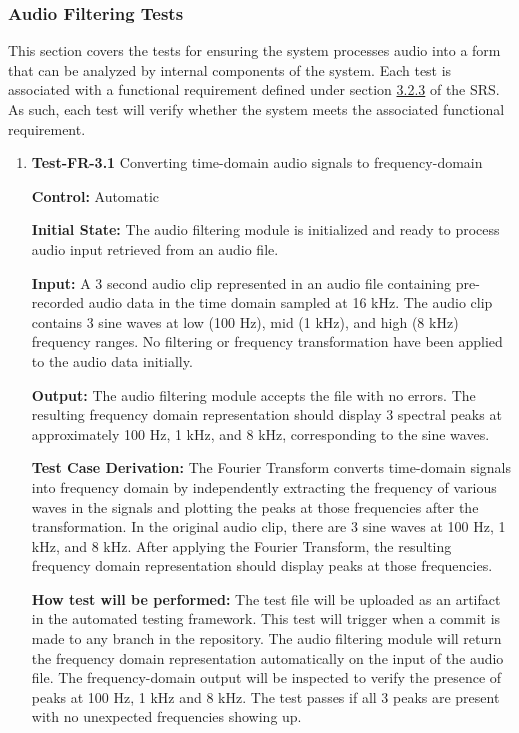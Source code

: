 \documentclass[12pt, titlepage]{article}
\begin{document}
\subsubsection{Audio Filtering Tests}

This section covers the tests for ensuring the system processes audio into a
form that can be analyzed by internal components of the system. Each test is
associated with a functional requirement defined under section
\hyperref[SRS-sec:FR3]{3.2.3} of the SRS. As such, each test will verify whether
the system meets the associated functional requirement. 

\begin{enumerate}

\item{\textbf{Test-FR-3.1} Converting time-domain audio signals to
frequency-domain \\}

\textbf{Control:} Automatic
					
\textbf{Initial State:} 
The audio filtering module is initialized and ready to process audio input
retrieved from an audio file. 
					
\textbf{Input:}
A 3 second audio clip represented in an audio file containing pre-recorded audio
data in the time domain sampled at 16 kHz. The audio clip contains 3 sine waves
at low (100 Hz), mid (1 kHz), and high (8 kHz) frequency ranges. No filtering or
frequency transformation have been applied to the audio data initially.
					
\textbf{Output:}
The audio filtering module accepts the file with no errors. The resulting
frequency domain representation should display 3 spectral peaks at approximately
100 Hz, 1 kHz, and 8 kHz, corresponding to the sine waves.

\textbf{Test Case Derivation:} 
The Fourier Transform converts time-domain signals into frequency domain by
independently extracting the frequency of various waves in the signals and
plotting the peaks at those frequencies after the transformation. In the
original audio clip, there are 3 sine waves at 100 Hz, 1 kHz, and 8 kHz. After
applying the Fourier Transform, the resulting frequency domain representation
should display peaks at those frequencies.
					
\textbf{How test will be performed:}
The test file will be uploaded as an artifact in the automated testing
framework. This test will trigger when a commit is made to any branch in the
repository. The audio filtering module will return the frequency domain
representation automatically on the input of the audio file. The
frequency-domain output will be inspected to verify the presence of peaks at 100
Hz, 1 kHz and 8 kHz. The test passes if all 3 peaks are present with no
unexpected frequencies showing up.  
					

\end{enumerate}
\end{document}
